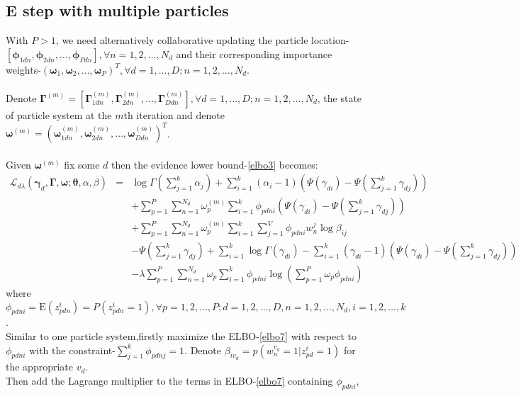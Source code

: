 \documentclass[a4paper]{article}
\newcommand{\be}{\begin{equation}}
\newcommand{\ee}{\end{equation}}
\newcommand{\bs}{\boldsymbol}
\newcommand{\ba}{\begin{array}}
\newcommand{\ea}{\end{array}}
\newcommand{\E}{\mathrm{E}}
\newcommand{\Sum}{\displaystyle\sum}
\begin{document}
\subsection{E step with multiple particles}
With $P>1$, we need alternatively collaborative updating the particle location-$[\bs{\phi}_{1dn},\bs{\phi}_{2dn},\ldots,\bs{\phi}_{Pdn}],\forall n=1,2,\ldots,N_d$ and their corresponding importance weights-$(\bs{\omega}_{1},\bs{\omega}_{2},\ldots,\bs{\omega}_{P})^T,\forall d=1,\ldots,D;n=1,2,\ldots,N_d$.\\
\\
Denote $\bs{\Gamma}^{(m)}=[\bs{\Gamma}_{1dn}^{(m)},\bs{\Gamma}_{2dn}^{(m)},\ldots,\bs{\Gamma}_{Ddn}^{(m)}],\forall d=1,\ldots,D;n=1,2,\ldots,N_d$, the state of  particle system at the $m$th iteration and denote $\bs{\omega}^{(m)}=(\bs{\omega}_{1dn}^{(m)},\bs{\omega}_{2dn}^{(m)},\ldots,\bs{\omega}_{Ddn}^{(m)})^T$.\\
\\
Given $\bs{\omega}^{(m)}$ fix some $d$ then the evidence lower bound-\ref{elbo3} becomes:\\
\be\label{elbo7}
\ba{rcl}
\mathcal{L}_{d\lambda}(\bs{\gamma}_d,\bs{\Gamma},\bs{\omega};\bs{\theta},\alpha,\beta)
&=&\log\Gamma(\sum_{j=1}^{k}\alpha_j)+\Sum_{i=1}^{k}(\alpha_i-1)(\Psi(\gamma_{di})-\Psi(\sum_{j=1}^{k}\gamma_{dj}))\\
&&+\Sum_{p=1}^{P}\Sum_{n=1}^{N_d}\omega_{p}^{(m)}\Sum_{i=1}^{k}\phi_{pdni}(\Psi(\gamma_{di})-\Psi(\sum_{j=1}^{k}\gamma_{dj}))\\
&&+\Sum_{p=1}^{P}\Sum_{n=1}^{N_d}\omega_{p}^{(m)}\Sum_{i=1}^{k}\Sum_{j=1}^{V}\phi_{pdni}w_n^j\log\beta_{ij}\\
&&-\Psi(\sum_{j=1}^{k}\gamma_{dj})+\Sum_{i=1}^{k}\log\Gamma(\gamma_{di})-\Sum_{i=1}^{k}(\gamma_{di}-1)(\Psi(\gamma_{di})-\Psi(\sum_{j=1}^{k}\gamma_{dj}))\\
&&-\lambda\Sum_{p=1}^{P}\Sum_{n=1}^{N_d}\omega_{p}\Sum_{i=1}^{k}\phi_{pdni}\log(\sum_{p=1}^{P}\omega_{p}\phi_{pdni})
\ea
\ee
where $\phi_{pdni}=\E(z_{pdn}^{i})=P(z_{pdn}^{i}=1),\forall p=1,2,\ldots,P;d=1,2,\ldots,D,n=1,2,\ldots,N_d,i=1,2,\ldots,k$.\\
Similar to one particle system,firstly maximize the ELBO-\ref{elbo7} with respect to $\phi_{pdni}$ with the constraint-$\sum_{j=1}^{k}\phi_{pdnj}=1$.
Denote $\beta_{iv_d}=p(w_n^{v_d}=1|z_{pd}^i=1)$ for the appropriate $v_d$.\\
Then  add the Lagrange multiplier to the terms in ELBO-\ref{elbo7} containing $\phi_{pdni}$,\\
\end{document}
